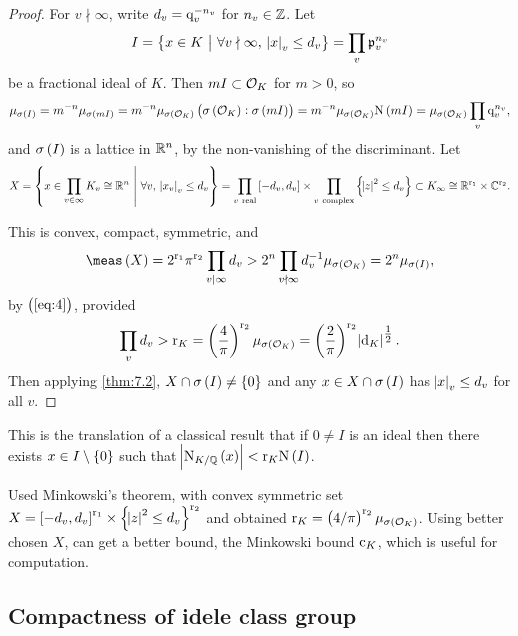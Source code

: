 \begin{proof}
For $ v \nmid \infty $, write $ d_v = \mathrm{q}_v^{-n_v} $ for $ n_v \in \mathbb{Z} $. Let
$$ I = \cbr{x \in K \st \forall v \nmid \infty, \ \abs{x}_v \le d_v} = \prod_v \ppp_v^{n_v} $$
be a fractional ideal of $ K $. Then $ mI \subset \mathcal{O}_K $ for $ m > 0 $, so
\begin{equation}
\label{eq:4}
\mu_{\sigma\br{I}} = m^{-n}\mu_{\sigma\br{mI}} = m^{-n}\mu_{\sigma\br{\OOO_K}}\br{\sigma\br{\OOO_K} : \sigma\br{mI}} = m^{-n}\mu_{\sigma\br{\OOO_K}}\N\br{mI} = \mu_{\sigma\br{\OOO_K}}\prod_v \q_v^{n_v},
\end{equation}
and $ \sigma\br{I} $ is a lattice in $ \mathbb{R}^n $, by the non-vanishing of the discriminant. Let
$$ X = \cbr{x \in \prod_{v \in \infty} K_v \cong \RR^n \st \forall v, \ \abs{x_v}_v \le d_v} = \prod_{v \ \text{real}} \sbr{-d_v, d_v} \times \prod_{v \ \text{complex}} \cbr{\abs{z}^2 \le d_v} \subset K_\infty \cong \RR^{\r_1} \times \CC^{\r_2}. $$

\pagebreak

This is convex, compact, symmetric, and
$$ \meas\br{X} = 2^{\r_1}\pi^{\r_2}\prod_{v \mid \infty} d_v > 2^n\prod_{v \nmid \infty} d_v^{-1}\mu_{\sigma\br{\OOO_K}} = 2^n\mu_{\sigma\br{I}}, $$
by $ \br{\ref{eq:4}} $, provided
$$ \prod_v d_v > \r_K = \br{\dfrac{4}{\pi}}^{\r_2}\mu_{\sigma\br{\OOO_K}} = \br{\dfrac{2}{\pi}}^{\r_2}\abs{\d_K}^{\tfrac{1}{2}}. $$
Then applying \ref{thm:7.2}, $ X \cap \sigma\br{I} \ne \cbr{0} $ and any $ x \in X \cap \sigma\br{I} $ has $ \abs{x}_v \le d_v $ for all $ v $.
\end{proof}

This is the translation of a classical result that if $ 0 \ne I $ is an ideal then there exists $ x \in I \setminus \cbr{0} $ such that $ \abs{\N_{K / \QQ}\br{x}} < \r_K\N\br{I} $.


\begin{remark*}
Used Minkowski's theorem, with convex symmetric set $ X = \sbr{-d_v, d_v}^{\r_1} \times \cbr{\abs{z}^2 \le d_v}^{\r_2} $ and obtained $ \r_K = \br{4 / \pi}^{\r_2}\mu_{\sigma\br{\OOO_K}} $. Using better chosen $ X $, can get a better bound, the Minkowski bound $ \mathrm{c}_K $, which is useful for computation.
\end{remark*}

\subsection{Compactness of idele class group}

